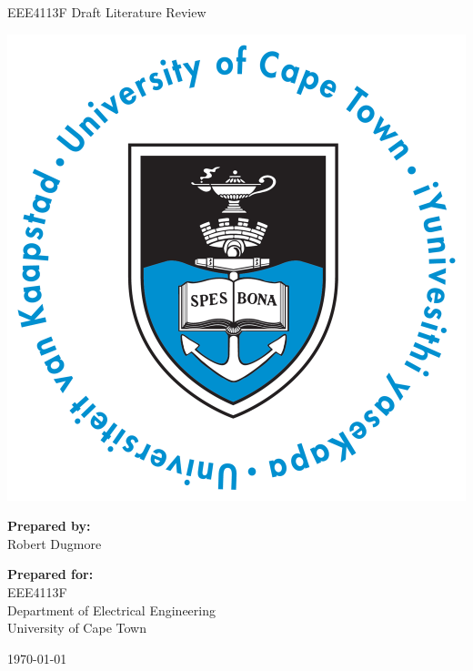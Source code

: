\thispagestyle{empty}
\begin{center}
    
\Huge

\vspace{5cm}

EEE4113F Draft Literature Review

\vspace{2.5cm}

\includegraphics[width=0.4\linewidth]{FrontMatter/UCT_logo.png}

\vfill

\large
\textbf{Prepared by:}\\
Robert Dugmore

\vspace{1cm}

\textbf{Prepared for:}\\
EEE4113F\\
Department of Electrical Engineering\\
University of Cape Town

\vspace{2cm}

\today


\end{center}